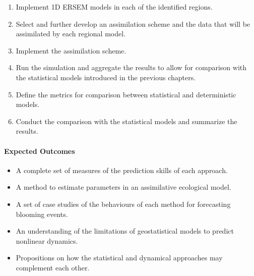 \begin{enumerate}

\item Implement 1D ERSEM models in each of the identified regions.

\item Select and further develop an assimilation scheme and the data that will
be assimilated by each regional model.

\item Implement the assimilation scheme.

\item Run the simulation and aggregate the results to allow for comparison with
the statistical models introduced in the previous chapters.

\item Define the metrics for comparison between statistical and deterministic
models.

\item Conduct the comparison with the statistical models and summarize the
results.

\end{enumerate}

\paragraph{Expected Outcomes}

\begin{itemize}

\item A complete set of measures of the prediction skills of each approach.

\item A method to estimate parameters in an assimilative ecological model.

\item A set of case studies of the behaviours of each method for forecasting
blooming events.

\item An understanding of the limitations of geostatistical models to predict
nonlinear dynamics. 

\item Propositions on how the statistical and dynamical approaches may
complement each other.

\end{itemize}
